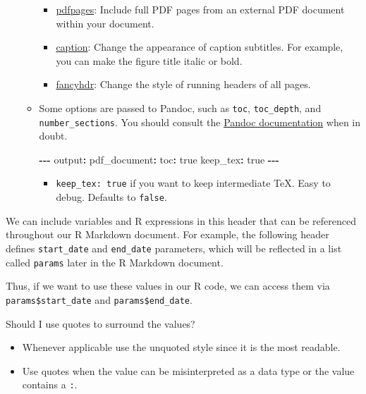 \documentclass[
]{book}
\newenvironment{Shaded}{\begin{snugshade}}{\end{snugshade}}
\newcommand{\NormalTok}[1]{#1}
\newcommand{\SpecialCharTok}[1]{\textcolor[rgb]{0.81,0.36,0.00}{\textbf{#1}}}
\providecommand{\tightlist}{%
  \setlength{\itemsep}{0pt}\setlength{\parskip}{0pt}}
\begin{document}
\begin{itemize}
\begin{itemize}
    \begin{itemize}
    \tightlist
    \item
      \href{https://ctan.org/pkg/pdfpages}{pdfpages}: Include full PDF pages from an external PDF document within your document.
    \item
      \href{https://ctan.org/pkg/caption}{caption}: Change the appearance of caption subtitles. For example, you can make the figure title italic or bold.
    \item
      \href{https://ctan.org/pkg/fancyhdr}{fancyhdr}: Change the style of running headers of all pages.
    \end{itemize}
  \item
    Some options are passed to Pandoc, such as \texttt{toc}, \texttt{toc\_depth}, and \texttt{number\_sections}. You should consult the \href{https://pandoc.org/MANUAL.html\#variables}{Pandoc documentation} when in doubt.

\begin{Shaded}
\begin{Highlighting}[]
\SpecialCharTok{{-}{-}{-}}
\NormalTok{output}\SpecialCharTok{:}
\NormalTok{  pdf\_document}\SpecialCharTok{:}
\NormalTok{    toc}\SpecialCharTok{:}\NormalTok{ true}
\NormalTok{        keep\_tex}\SpecialCharTok{:}\NormalTok{ true}
\SpecialCharTok{{-}{-}{-}}
\end{Highlighting}
\end{Shaded}

    \begin{itemize}
    \tightlist
    \item
      \texttt{keep\_tex:\ true} if you want to keep intermediate TeX. Easy to debug. Defaults to \texttt{false}.
    \end{itemize}
  \end{itemize}
\end{itemize}

We can include variables and R expressions in this header that can be referenced throughout our R Markdown document. For example, the following header defines \texttt{start\_date} and \texttt{end\_date} parameters, which will be reflected in a list called \texttt{params} later in the R Markdown document.

Thus, if we want to use these values in our R code, we can access them via \texttt{params\$start\_date} and \texttt{params\$end\_date}.

Should I use quotes to surround the values?

\begin{itemize}
\tightlist
\item
  Whenever applicable use the unquoted style since it is the most readable.
\item
  Use quotes when the value can be misinterpreted as a data type or the value contains a \texttt{:}.
\end{itemize}
\end{document}
